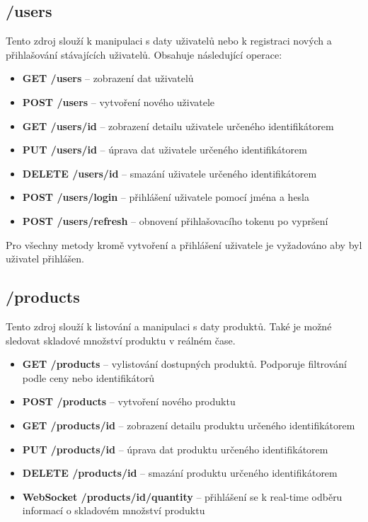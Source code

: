 \documentclass[thesis=M,czech]{FITthesis}[2019/12/23]
\begin{document}
\subsection{/users}
Tento zdroj slouží k manipulaci s daty uživatelů nebo k registraci nových a přihlašování stávajících uživatelů. Obsahuje následující operace:

\begin{itemize}
  \item \textbf{GET /users} -- zobrazení dat uživatelů
  \item \textbf{POST /users} -- vytvoření nového uživatele
  \item \textbf{GET /users/{id}} -- zobrazení detailu uživatele určeného identifikátorem
  \item \textbf{PUT /users/{id}} -- úprava dat uživatele určeného identifikátorem
  \item \textbf{DELETE /users/{id}} -- smazání uživatele určeného identifikátorem
  \item \textbf{POST /users/login} -- přihlášení uživatele pomocí jména a hesla
  \item \textbf{POST /users/refresh} -- obnovení přihlašovacího tokenu po vypršení
\end{itemize}

Pro všechny metody kromě vytvoření a přihlášení uživatele je vyžadováno aby byl uživatel přihlášen.

\subsection{/products}
Tento zdroj slouží k listování a manipulaci s daty produktů. Také je možné sledovat skladové množství produktu v reálném čase.

\begin{itemize}
  \item \textbf{GET /products} -- vylistování dostupných produktů. Podporuje filtrování podle ceny nebo identifikátorů
  \item \textbf{POST /products} -- vytvoření nového produktu
  \item \textbf{GET /products/{id}} -- zobrazení detailu produktu určeného identifikátorem
  \item \textbf{PUT /products/{id}} -- úprava dat produktu určeného identifikátorem
  \item \textbf{DELETE /products/{id}} -- smazání produktu určeného identifikátorem
  \item \textbf{WebSocket /products/{id}/quantity} -- přihlášení se k real-time odběru informací o skladovém množství produktu
\end{itemize}
\end{document}
